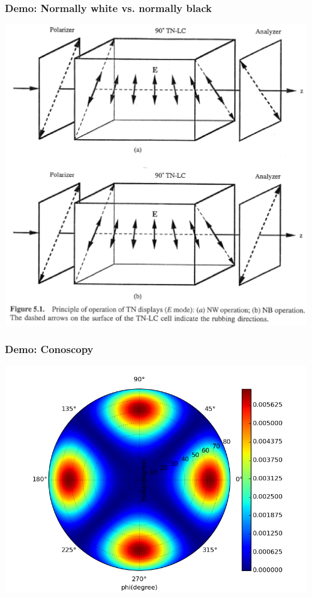 \documentclass{beamer}
\begin{document}
\begin{frame}
\frametitle{Demo: Normally white vs. normally black}
\begin{center}
\includegraphics[scale=0.4]{TN_NW_NB.eps}
\end{center}
\end{frame}
\begin{frame}
\frametitle{Demo: Conoscopy}
\begin{center}
\includegraphics[scale=0.4]{conoscopy.png}
\end{center}
\end{frame}
\end{document}
